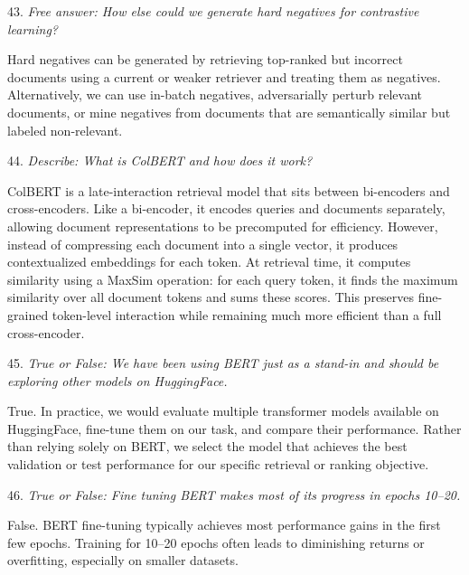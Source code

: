 \vspace{1cm}

43. \textit{Free answer: How else could we generate hard negatives for contrastive learning?}

Hard negatives can be generated by retrieving top-ranked but incorrect documents using a current or weaker retriever and treating them as negatives. Alternatively, we can use in-batch negatives, adversarially perturb relevant documents, or mine negatives from documents that are semantically similar but labeled non-relevant.

\vspace{1cm}

44. \textit{Describe: What is ColBERT and how does it work?}

ColBERT is a late-interaction retrieval model that sits between bi-encoders and cross-encoders. Like a bi-encoder, it encodes queries and documents separately, allowing document representations to be precomputed for efficiency. However, instead of compressing each document into a single vector, it produces contextualized embeddings for each token. At retrieval time, it computes similarity using a MaxSim operation: for each query token, it finds the maximum similarity over all document tokens and sums these scores. This preserves fine-grained token-level interaction while remaining much more efficient than a full cross-encoder.



\vspace{1cm}

45. \textit{True or False: We have been using BERT just as a stand-in and should be exploring other models on HuggingFace.}

True. In practice, we would evaluate multiple transformer models available on HuggingFace, fine-tune them on our task, and compare their performance. Rather than relying solely on BERT, we select the model that achieves the best validation or test performance for our specific retrieval or ranking objective.

\vspace{1cm}

46. \textit{True or False: Fine tuning BERT makes most of its progress in epochs 10–20.}

False. BERT fine-tuning typically achieves most performance gains in the first few epochs. Training for 10–20 epochs often leads to diminishing returns or overfitting, especially on smaller datasets.

\vspace{1cm}


